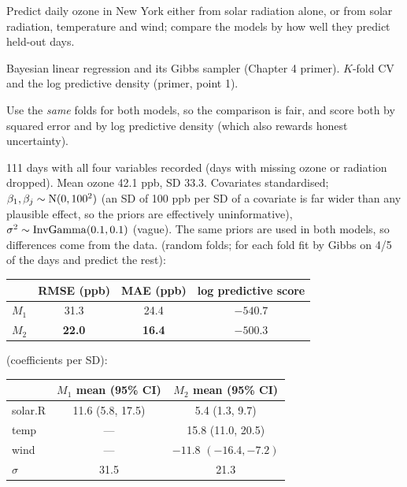 \documentclass[11pt]{article}
\begin{document}
\begin{restate}
Predict daily ozone in New York either from solar radiation alone, or from solar radiation, temperature and wind; compare the models by how well they predict held-out days.
\end{restate}

\begin{recall}
Bayesian linear regression and its Gibbs sampler (Chapter 4 primer). $K$-fold CV and the log predictive density (primer, point 1).
\end{recall}

\begin{keyidea}
Use the \emph{same} folds for both models, so the comparison is fair, and score both by squared error and by log predictive density (which also rewards honest uncertainty).
\end{keyidea}

\solution
{} 111 days with all four variables recorded (days with missing ozone or radiation dropped). Mean ozone 42.1 ppb, SD 33.3.
 Covariates standardised; $\beta_1,\beta_j\sim\mathrm{N}(0,100^2)$ (an SD of 100 ppb per SD of a covariate is far wider than any plausible effect, so the priors are effectively uninformative), $\sigma^2\sim\mathrm{InvGamma}(0.1,0.1)$ (vague). The same priors are used in both models, so differences come from the data.
 (random folds; for each fold fit by Gibbs on 4/5 of the days and predict the rest):
\begin{center}
\begin{tabular}{lccc}\toprule
 & RMSE (ppb) & MAE (ppb) & log predictive score\\\midrule
$M_1$ & 31.3 & 24.4 & $-540.7$\\
$M_2$ & \textbf{22.0} & \textbf{16.4} & $\mathbf{-500.3}$\\\bottomrule
\end{tabular}
\end{center}
 (coefficients per SD):
\begin{center}
\begin{tabular}{lcc}\toprule
 & $M_1$ mean (95\% CI) & $M_2$ mean (95\% CI)\\\midrule
solar.R & 11.6 (5.8, 17.5) & 5.4 (1.3, 9.7)\\
temp & --- & 15.8 (11.0, 20.5)\\
wind & --- & $-11.8$ $(-16.4,-7.2)$\\
$\sigma$ & 31.5 & 21.3\\\bottomrule
\end{tabular}
\end{center}
\end{document}
